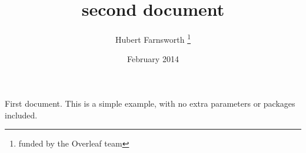 \documentclass[12pt, letterpaper]{article}
\title{second document}
\author{Hubert Farnsworth \thanks{funded by the Overleaf team}}
\date{February 2014}
\begin{document}
\begin{titlepage}
\maketitle
\end{titlepage}

\begin{comment}
This here is just a random comment, i wanted to use
\end{comment}



First document. This is a simple example, with no 
extra parameters or packages included.
\end{document}
